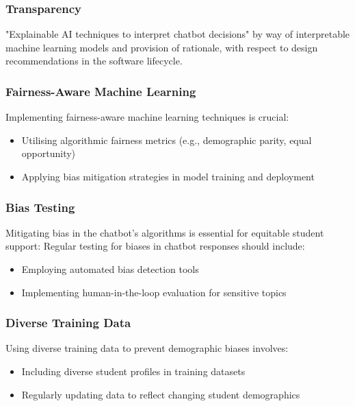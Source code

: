 \documentclass[14pt,a4paper]{article}
\begin{document}
\begin{multicols}{2}
\subsubsection{Transparency}
 "Explainable AI techniques to interpret chatbot decisions" \textit{\parencite[pp. 82-115]{Arrieta2022}} by way of interpretable machine learning models and provision of rationale, with respect to design recommendations in the software lifecycle.


 \subsubsection{Fairness-Aware Machine Learning}
Implementing fairness-aware machine learning techniques \textit{\parencite{Barocas2021}} is crucial:
\begin{itemize}
    \item Utilising algorithmic fairness metrics (e.g., demographic parity, equal opportunity)
    \item Applying bias mitigation strategies in model training and deployment
\end{itemize}

\subsubsection*{Bias Testing}
Mitigating bias in the chatbot's algorithms is essential for equitable student support:
Regular testing for biases in chatbot responses \textit{\parencite{ACMFAccT2024}} should include:
\begin{itemize}
    \item Employing automated bias detection tools
    \item Implementing human-in-the-loop evaluation for sensitive topics
\end{itemize}

\subsubsection*{Diverse Training Data}
Using diverse training data to prevent demographic biases \textit{\parencite[pp. 1-35]{Mehrabi2023}} involves:
\begin{itemize}
    \item Including diverse student profiles in training datasets
    \item Regularly updating data to reflect changing student demographics
\end{itemize}


\end{multicols}
\end{document}
